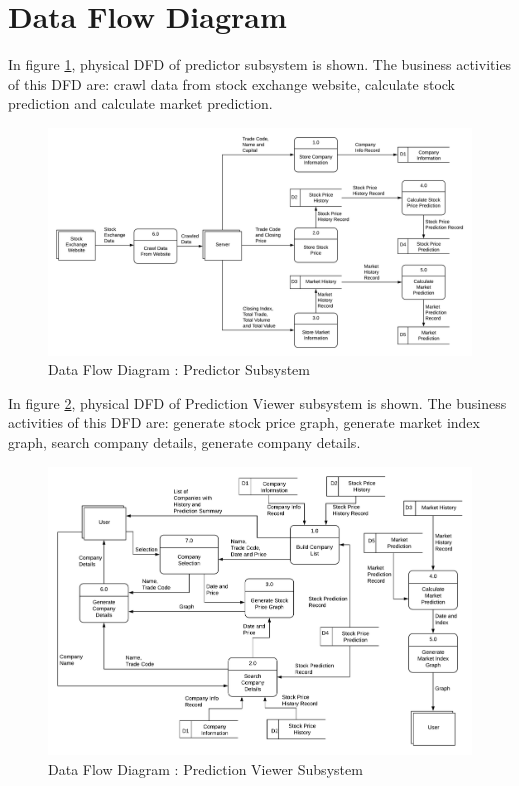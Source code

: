 \documentclass{article}[12pt]
\begin{document}
\newpage
\section{Data Flow Diagram}
    
    In figure \ref{fig:DFD_Predictor}, physical DFD of predictor subsystem is shown. The business activities of this DFD are: crawl data from stock exchange website, calculate stock prediction and calculate market prediction.
    
    \begin{figure}[!h]
        \centering
        \includegraphics[width=.9\textwidth]{Images/DFD_Predictor.png}
        \caption{Data Flow Diagram : Predictor Subsystem}
        \label{fig:DFD_Predictor}
    \end{figure}
    
    \newpage
    In figure \ref{fig:DFD_Viewer}, physical DFD of Prediction Viewer subsystem is shown. The business activities of this DFD are: generate stock price graph, generate market index graph, search company details, generate company details.
    
    
    \begin{figure}[!h]
        \centering
        \includegraphics[width=.9\textwidth]{Images/DFD_PredictionViewer.png}
        \caption{Data Flow Diagram : Prediction Viewer Subsystem}
        \label{fig:DFD_Viewer}
    \end{figure}
\end{document}
